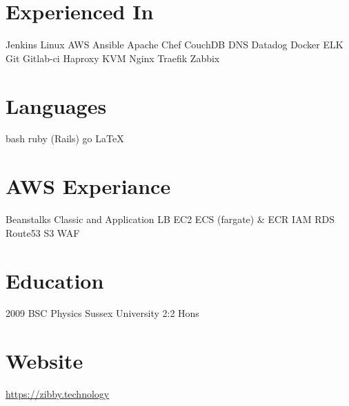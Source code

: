 \documentclass[]{friggeri-cv-a4}
\begin{document}
\fancyfoot{}

\begin{aside}
	\section{Experienced In}
		Jenkins
		Linux
    AWS
    Ansible
    Apache
    Chef
    CouchDB
    DNS
    Datadog
    Docker
    ELK
    Git
    Gitlab-ci
    Haproxy
    KVM
    Nginx
    Traefik
    Zabbix
  \section{Languages}
    bash
		ruby (Rails)
    go
    \LaTeX{}
  \section{AWS Experiance}
    Beanstalks
    Classic and Application LB
    EC2
    ECS (fargate) \& ECR
    IAM
    RDS
    Route53
    S3
    WAF
  \section{Education}
    2009 BSC Physics Sussex University 2:2 Hons
  \section{Website}
  \href{https://zibby.technology}{https://zibby.technology}
\end{aside}
\end{document}
